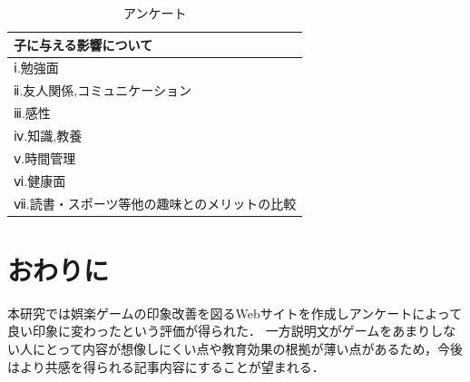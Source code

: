 \documentclass[twocolumn,10pt,a4j]{ltjsarticle}
\begin{document}
\vspace{1zh}
\begin{table}[h]
 \caption{アンケート}
 \label{table:SpeedOfLight}
 \centering
  \begin{tabular}{l}
  \hline
  子に与える影響について \\
   \hline \hline
   ⅰ.勉強面 \\
   ⅱ.友人関係,コミュニケーション\\
   ⅲ.感性\\
   ⅳ.知識,教養 \\
   ⅴ.時間管理   \\
   ⅵ.健康面 \\
   ⅶ.読書・スポーツ等他の趣味とのメリットの比較 \\
   \hline
  \end{tabular}
\end{table}









\section{おわりに}
本研究では娯楽ゲームの印象改善を図るWebサイトを作成しアンケートによって良い印象に変わったという評価が得られた．
一方説明文がゲームをあまりしない人にとって内容が想像しにくい点や教育効果の根拠が薄い点があるため，今後はより共感を得られる記事内容にすることが望まれる．
\end{document}
